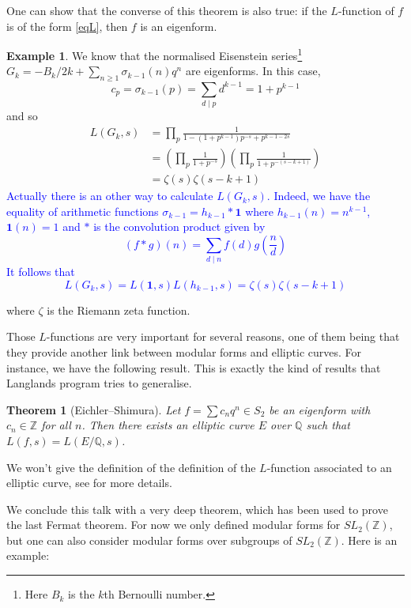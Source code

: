 \documentclass[12pt,a4paper,english]{article}
\theoremstyle{plain}
\newtheorem{thm}{Theorem}[section]
\theoremstyle{definition}
\newtheorem*{ex}{Example}
\begin{document}
One can show that the converse of this theorem is also true: if the $L$-function of $f$ is of the form \eqref{eqL}, then $f$ is an eigenform.

\begin{ex}
We know that the normalised Eisenstein series\footnote{Here $B_k$ is the $k$th Bernoulli number.} $G_k=-B_k/2k+\sum_{n\geqslant 1}\sigma_{k-1}(n)q^n$ are eigenforms. In this case,
\begin{equation*}
    c_p=\sigma_{k-1}(p)=\sum_{d\mid p}d^{k-1}=1+p^{k-1}
\end{equation*}
and so
\begin{align*}
    L(G_k,s)&=\prod_p\frac{1}{1-(1+p^{k-1})p^{-s}+p^{k-1-2s}}\\
    &=\left(\prod_p\frac{1}{1+p^{-s}}\right)\left(\prod_p\frac{1}{1+p^{-(s-k+1)}}\right)\\
    &=\zeta(s)\zeta(s-k+1)
\end{align*}
\textcolor{blue}{
Actually there is an other way to calculate $L(G_k,s)$. Indeed, we have the equality of arithmetic functions $\sigma_{k-1}=h_{k-1} * \mathbf{1}$ where $h_{k-1}(n)=n^{k-1}$, $\mathbf{1}(n)=1$ and $*$ is the convolution product given by
\begin{equation*}
    (f*g)(n)=\sum_{d\mid n}f(d)g\left(\frac{n}{d}\right)
\end{equation*}
It follows that
\begin{equation*}
    L(G_k,s)=L(\mathbf{1},s)L(h_{k-1},s)=\zeta(s)\zeta(s-k+1)
\end{equation*}
}
\end{ex}
where $\zeta$ is the Riemann zeta function.

Those $L$-functions are very important for several reasons, one of them being that they provide another link between modular forms and elliptic curves. For instance, we have the following result. This is exactly the kind of results that Langlands program tries to generalise.

\begin{thm}[Eichler–Shimura]
Let $f=\sum c_n q^n\in S_2$ be an eigenform with $c_n\in\mathbb{Z}$ for all $n$. Then there exists an elliptic curve $E$ over $\mathbb{Q}$ such that $L(f, s)=L(E/\mathbb{Q}, s)$.
\end{thm}

We won't give the definition of the definition of the $L$-function associated to an elliptic curve, see \cite[p.44]{zag} for more details.

We conclude this talk with a very deep theorem, which has been used to prove the last Fermat theorem. For now we only defined modular forms for $SL_2(\mathbb{Z})$, but one can also consider modular forms over subgroups of $SL_2(\mathbb{Z})$. Here is an example:
\end{document}
